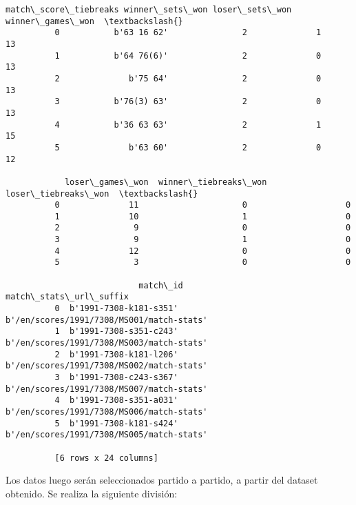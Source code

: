 \documentclass[11pt]{article}
\begin{document}
\begin{Verbatim}[commandchars=\\\{\}]
            match\_score\_tiebreaks winner\_sets\_won loser\_sets\_won winner\_games\_won  \textbackslash{}
          0           b'63 16 62'               2              1               13   
          1           b'64 76(6)'               2              0               13   
          2              b'75 64'               2              0               13   
          3           b'76(3) 63'               2              0               13   
          4           b'36 63 63'               2              1               15   
          5              b'63 60'               2              0               12   
          
            loser\_games\_won  winner\_tiebreaks\_won  loser\_tiebreaks\_won  \textbackslash{}
          0              11                     0                    0   
          1              10                     1                    0   
          2               9                     0                    0   
          3               9                     1                    0   
          4              12                     0                    0   
          5               3                     0                    0   
          
                           match\_id                     match\_stats\_url\_suffix  
          0  b'1991-7308-k181-s351'  b'/en/scores/1991/7308/MS001/match-stats'  
          1  b'1991-7308-s351-c243'  b'/en/scores/1991/7308/MS003/match-stats'  
          2  b'1991-7308-k181-l206'  b'/en/scores/1991/7308/MS002/match-stats'  
          3  b'1991-7308-c243-s367'  b'/en/scores/1991/7308/MS007/match-stats'  
          4  b'1991-7308-s351-a031'  b'/en/scores/1991/7308/MS006/match-stats'  
          5  b'1991-7308-k181-s424'  b'/en/scores/1991/7308/MS005/match-stats'  
          
          [6 rows x 24 columns]
\end{Verbatim}
            
    Los datos luego serán seleccionados partido a partido, a partir del
dataset obtenido. Se realiza la siguiente división:
\end{document}
